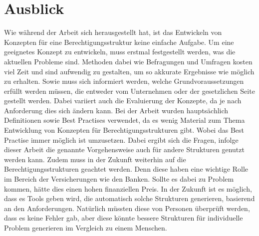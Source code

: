 \section{Ausblick}
\label{sec:chapter06:Ausblick}
Wie während der Arbeit sich herausgestellt hat, ist das Entwickeln von Konzepten für eine Berechtigungsstruktur keine einfache Aufgabe.
Um eine geeignetes Konzept zu entwickeln, muss erstmal festgestellt werden, was die aktuellen Probleme sind.
Methoden dabei wie Befragungen und Umfragen kosten viel Zeit und sind aufwendig zu gestalten, um so akkurate Ergebnisse wie möglich zu erhalten.
Sowie muss sich informiert werden, welche Grundvoraussetzungen erfüllt werden müssen, die entweder vom Unternehmen oder der gesetzlichen Seite gestellt werden.
Dabei variiert auch die Evaluierung der Konzepte, da je nach Anforderung dies sich ändern kann.
\newline
Bei der Arbeit wurden hauptsächlich Definitionen sowie Best Practises verwendet, da es wenig Material zum Thema Entwicklung von Konzepten für Berechtigungsstrukturen gibt.
Wobei das Best Practise immer möglich ist umzusetzen.
Dabei ergibt sich die Fragen, infolge dieser Arbeit die genannte Vorgehensweise auch für andere Strukturen genutzt werden kann.
\newline
Zudem muss in der Zukunft weiterhin auf die Berechtigungsstrukturen geachtet werden.
Denn diese haben eine wichtige Rolle im Bereich der Versicherungen wie den Banken.
Sollte es dabei zu Problem kommen, hätte dies einen hohen finanziellen Preis.
In der Zukunft ist es möglich, dass es Tools geben wird, die automatisch solche Strukturen generieren, basierend an den Anforderungen.
Natürlich müssten diese von Personen überprüft werden, dass es keine Fehler gab, aber diese könnte bessere Strukturen für individuelle Problem generieren im Vergleich zu einem Menschen.